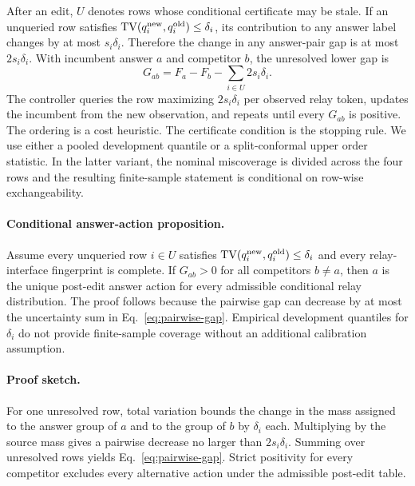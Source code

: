 \documentclass[11pt]{article}
\begin{document}
After an edit, $U$ denotes rows whose conditional certificate may be stale. If an unqueried row satisfies $\operatorname{TV}(q_i^{\rm new},q_i^{\rm old})\leq\delta_i$, its contribution to any answer label changes by at most $s_i\delta_i$. Therefore the change in any answer-pair gap is at most $2s_i\delta_i$. With incumbent answer $a$ and competitor $b$, the unresolved lower gap is
\begin{equation}
G_{ab}=F_a-F_b-\sum_{i\in U}2s_i\delta_i.
\label{eq:pairwise-gap}
\end{equation}
The controller queries the row maximizing $2s_i\delta_i$ per observed relay token, updates the incumbent from the new observation, and repeats until every $G_{ab}$ is positive. The ordering is a cost heuristic. The certificate condition is the stopping rule. We use either a pooled development quantile or a split-conformal upper order statistic. In the latter variant, the nominal miscoverage is divided across the four rows and the resulting finite-sample statement is conditional on row-wise exchangeability.

\paragraph{Conditional answer-action proposition.}
Assume every unqueried row $i\in U$ satisfies $\operatorname{TV}(q_i^{\rm new},q_i^{\rm old})\leq\delta_i$ and every relay-interface fingerprint is complete. If $G_{ab}>0$ for all competitors $b\neq a$, then $a$ is the unique post-edit answer action for every admissible conditional relay distribution. The proof follows because the pairwise gap can decrease by at most the uncertainty sum in Eq.~\ref{eq:pairwise-gap}. Empirical development quantiles for $\delta_i$ do not provide finite-sample coverage without an additional calibration assumption.

\paragraph{Proof sketch.}
For one unresolved row, total variation bounds the change in the mass assigned to the answer group of $a$ and to the group of $b$ by $\delta_i$ each. Multiplying by the source mass gives a pairwise decrease no larger than $2s_i\delta_i$. Summing over unresolved rows yields Eq.~\ref{eq:pairwise-gap}. Strict positivity for every competitor excludes every alternative action under the admissible post-edit table.
\end{document}
